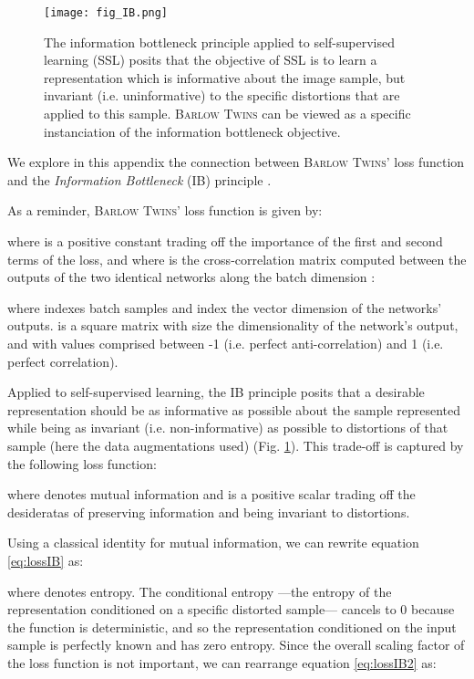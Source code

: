 \documentclass{article}
\newcommand{\AlgoName}{\textsc{Barlow Twins}}
\begin{document}
\begin{figure}[ht]
\vskip 0.2in
\begin{center}
\centerline{\texttt{[image: fig\_IB.png]}}
\caption{The information bottleneck principle applied to self-supervised learning (SSL) posits that the objective of SSL is to learn a representation  which is informative about the image sample, but invariant (i.e. uninformative) to the specific distortions that are applied to this sample. \AlgoName{} can be viewed as a specific instanciation of the information bottleneck objective.}
\label{fig:fig_IB}
\end{center}
\vskip -0.2in
\end{figure}

We explore in this appendix the connection between \AlgoName{}' loss function and the \emph{Information Bottleneck} (IB) principle \cite{tishby_deep_2015,tishby_information_2000}. 

As a reminder, \AlgoName{}' loss function is given by:



where  is a positive constant trading off the importance of the first and second terms of the loss, and where  is the cross-correlation matrix computed between the outputs of the two identical networks along the batch dimension :



where  indexes batch samples and  index the vector dimension of the networks' outputs.  is a square matrix with size the dimensionality of the network's output, and with values comprised between -1 (i.e. perfect anti-correlation) and 1 (i.e. perfect correlation). 

Applied to self-supervised learning, the IB principle posits that a desirable representation should be as informative as possible about the sample represented while being as invariant (i.e. non-informative) as possible to distortions of that sample (here the data augmentations used) (Fig. \ref{fig:fig_IB}). This trade-off is captured by the following loss function:



where  denotes mutual information and  is a positive scalar trading off the desideratas of preserving information and being invariant to distortions.

Using a classical identity for mutual information, we can rewrite equation \ref{eq:lossIB} as:



where  denotes entropy. The conditional entropy  ---the entropy of the representation conditioned on a specific distorted sample--- cancels to 0 because the function  is deterministic, and so the representation  conditioned on the input sample  is perfectly known and has zero entropy. Since the overall scaling factor of the loss function is not important, we can rearrange equation \ref{eq:lossIB2} as: 
\end{document}
